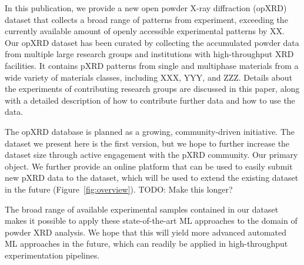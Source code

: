 In this publication, we provide a new open powder X-ray diffraction (opXRD) dataset that collects a broad range of patterns from experiment, exceeding the currently available amount of openly accessible experimental patterns by XX.
Our opXRD dataset has been curated by collecting the accumulated powder data from multiple large research groups and institutions with high-throughput XRD facilities. It contains pXRD patterns from single and multiphase materials from a wide variety of materials classes, including XXX, YYY, and ZZZ. Details about the experiments of contributing research groups are discussed in this paper, along with a detailed description of how to contribute further data and how to use the data.

The opXRD database is planned as a growing, community-driven initiative. The dataset we present here is the first version, but we hope to further increase the dataset size through active engagement with the pXRD community. Our primary object. We further provide an online platform that can be used to easily submit new pXRD data to the dataset, which will be used to extend the existing dataset in the future (Figure~\ref{fig:overview}).
TODO: Make this longer?





The broad range of available experimental samples contained in our dataset makes it possible to apply these state-of-the-art ML approaches to the domain of powder XRD analysis.
We hope that this will yield more advanced automated ML approaches in the future, which can readily be applied in high-throughput experimentation pipelines.








